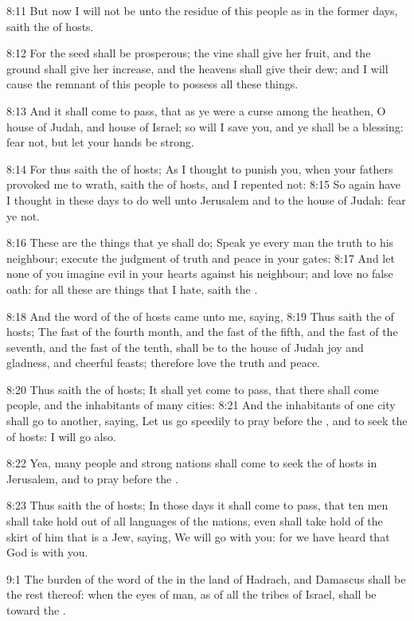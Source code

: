 8:11 But now I will not be unto the residue of this people as in the
former days, saith the \LORD of hosts.

8:12 For the seed shall be prosperous; the vine shall give her fruit,
and the ground shall give her increase, and the heavens shall give
their dew; and I will cause the remnant of this people to possess all
these things.

8:13 And it shall come to pass, that as ye were a curse among the
heathen, O house of Judah, and house of Israel; so will I save you,
and ye shall be a blessing: fear not, but let your hands be strong.

8:14 For thus saith the \LORD of hosts; As I thought to punish you,
when your fathers provoked me to wrath, saith the \LORD of hosts, and I
repented not: 8:15 So again have I thought in these days to do well
unto Jerusalem and to the house of Judah: fear ye not.

8:16 These are the things that ye shall do; Speak ye every man the
truth to his neighbour; execute the judgment of truth and peace in
your gates: 8:17 And let none of you imagine evil in your hearts
against his neighbour; and love no false oath: for all these are
things that I hate, saith the \LORD.

8:18 And the word of the \LORD of hosts came unto me, saying, 8:19 Thus
saith the \LORD of hosts; The fast of the fourth month, and the fast of
the fifth, and the fast of the seventh, and the fast of the tenth,
shall be to the house of Judah joy and gladness, and cheerful feasts;
therefore love the truth and peace.

8:20 Thus saith the \LORD of hosts; It shall yet come to pass, that
there shall come people, and the inhabitants of many cities: 8:21 And
the inhabitants of one city shall go to another, saying, Let us go
speedily to pray before the \LORD, and to seek the \LORD of hosts: I
will go also.

8:22 Yea, many people and strong nations shall come to seek the \LORD
of hosts in Jerusalem, and to pray before the \LORD.

8:23 Thus saith the \LORD of hosts; In those days it shall come to
pass, that ten men shall take hold out of all languages of the
nations, even shall take hold of the skirt of him that is a Jew,
saying, We will go with you: for we have heard that God is with you.

9:1 The burden of the word of the \LORD in the land of Hadrach, and
Damascus shall be the rest thereof: when the eyes of man, as of all
the tribes of Israel, shall be toward the \LORD.


